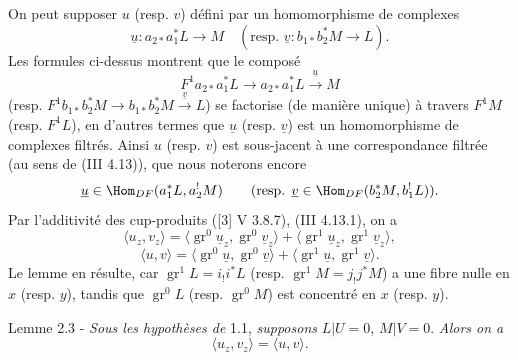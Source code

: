 On peut supposer $u$ (resp. $v$) défini par un homomorphisme de complexes
\[
\underline{u}:a_{2*}a_1^*L\longrightarrow M
\quad
(\text{resp. }\underline{v}:b_{1*}b_2^*M\longrightarrow L).
\]
Les formules ci-dessus montrent que le composé
\[
F^1a_{2*}a_1^*L\longrightarrow a_{2*}a_1^*L\xrightarrow{\underline{u}}M
\]
(resp. $F^1b_{1*}b_2^*M\to b_{1*}b_2^*M\xrightarrow{\underline{v}}L$) se factorise (de manière unique) à travers $F^1M$ (resp. $F^1L$), en d'autres termes que $\underline{u}$ (resp. $\underline{v}$) est un homomorphisme de complexes filtrés. Ainsi $u$ (resp. $v$) est sous-jacent à une correspondance filtrée (au sens de (III 4.13)), que nous noterons encore
\[
\underline{u}\in\Hom_{DF}(a_1^*L,a_2^!M)\qquad
(\text{resp. }\underline{v}\in\Hom_{DF}(b_2^*M,b_1^!L)).
\]
Par l'additivité des cup-produits ([3] V 3.8.7), (III 4.13.1), on a
\[
\langle u_z,v_z\rangle
 =\langle \operatorname{gr}^0\underline{u}_z,\operatorname{gr}^0\underline{v}_z\rangle
 +\langle \operatorname{gr}^1\underline{u}_z,\operatorname{gr}^1\underline{v}_z\rangle,
\]
\[
\langle u,v\rangle
 =\langle \operatorname{gr}^0\underline{u},\operatorname{gr}^0\underline{v}\rangle
 +\langle \operatorname{gr}^1\underline{u},\operatorname{gr}^1\underline{v}\rangle.
\]
Le lemme en résulte, car $\operatorname{gr}^1L=i_!i^*L$ (resp. $\operatorname{gr}^1M=j_!j^*M$) a une fibre nulle en $x$ (resp. $y$), tandis que $\operatorname{gr}^0L$ (resp. $\operatorname{gr}^0M$) est concentré en $x$ (resp. $y$).

\begin{statement}{Lemme 2.3 -}
\emph{Sous les hypothèses de} 1.1, \emph{supposons} $L|U=0$, $M|V=0$. \emph{Alors on a}
\[
\langle u_z,v_z\rangle=\langle u,v\rangle .
\]
\end{statement}

